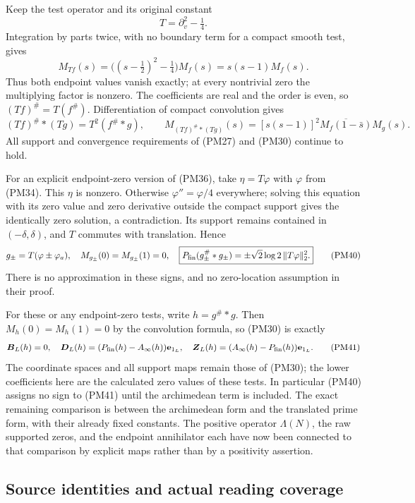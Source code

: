 \documentclass[
  10pt,
  a4paper,
]{article}
\begin{document}
Keep the test operator and its original constant \[
T=\partial_v^2-\tfrac14.
\tag{PM37}
\] Integration by parts twice, with no boundary term for a compact
smooth test, gives \[
M_{Tf}(s)=\bigl((s-\tfrac12)^2-\tfrac14\bigr)M_f(s)
=s(s-1)M_f(s).
\tag{PM38}
\] Thus both endpoint values vanish exactly; at every nontrivial zero
the multiplying factor is nonzero. The coefficients are real and the
order is even, so \((Tf)^\#=T(f^\#)\). Differentiation of compact
convolution gives \[
(Tf)^\#*(Tg)=T^2(f^\#*g),\qquad
M_{(Tf)^\#*(Tg)}(s)=[s(s-1)]^2
\overline{M_f(1-\bar s)}M_g(s).
\tag{PM39}
\] All support and convergence requirements of (PM27) and (PM30)
continue to hold.

For an explicit endpoint-zero version of (PM36), take \(\eta=T\varphi\)
with \(\varphi\) from (PM34). This \(\eta\) is nonzero. Otherwise
\(\varphi''=\varphi/4\) everywhere; solving this equation with its zero
value and zero derivative outside the compact support gives the
identically zero solution, a contradiction. Its support remains
contained in \((-\delta,\delta)\), and \(T\) commutes with translation.
Hence \[
g_\pm=T(\varphi\pm\varphi_a),\quad
M_{g_\pm}(0)=M_{g_\pm}(1)=0,\quad
\boxed{P_{\rm fin}(g_\pm^\#*g_\pm)
=\pm\sqrt2\log2\,\|T\varphi\|_2^2.}
\tag{PM40}
\] There is no approximation in these signs, and no zero-location
assumption in their proof.

For these or any endpoint-zero tests, write \(h=g^\#*g\). Then
\(M_h(0)=M_h(1)=0\) by the convolution formula, so (PM30) is exactly \[
\boldsymbol B_L(h)=0,\quad
\boldsymbol D_L(h)=(P_{\rm fin}(h)-A_\infty(h))\mathbf e_{1_L},\quad
\boldsymbol Z_L(h)=(A_\infty(h)-P_{\rm fin}(h))\mathbf e_{1_L}.
\tag{PM41}
\] The coordinate spaces and all support maps remain those of (PM30);
the lower coefficients here are the calculated zero values of these
tests. In particular (PM40) assigns no sign to (PM41) until the
archimedean term is included. The exact remaining comparison is between
the archimedean form and the translated prime form, with their already
fixed constants. The positive operator \(\Lambda(N)\), the raw supported
zeros, and the endpoint annihilator each have now been connected to that
comparison by explicit maps rather than by a positivity assertion.

\subsection{Source identities and actual reading
coverage}\label{source-identities-and-actual-reading-coverage}
\end{document}
